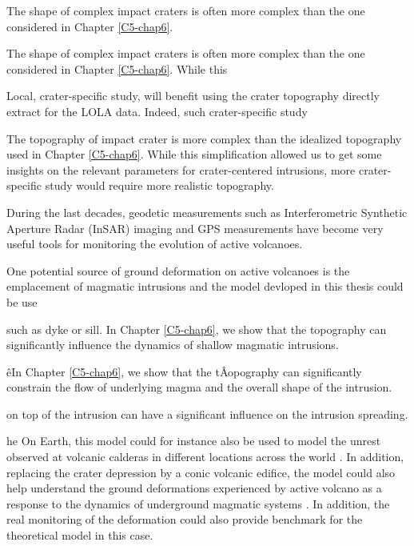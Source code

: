 The shape of complex impact craters is often more complex than the one
considered in Chapter \ref{C5-chap6}. 

The shape of complex impact craters is often more complex than the one
considered in Chapter \ref{C5-chap6}. While this 


Local,  crater-specific study,
will benefit using the crater topography directly extract for the LOLA
data.  Indeed,   such  crater-specific  study  


The topography  of impact  crater is more  complex than  the idealized
topography used  in Chapter \ref{C5-chap6}. While  this simplification
allowed  us  to get  some  insights  on  the relevant  parameters  for
crater-centered intrusions,  more crater-specific study  would require
more realistic topography. 





During the last decades, geodetic measurements such as Interferometric
Synthetic  Aperture Radar  (InSAR) imaging  and GPS  measurements have
become  very  useful tools  for  monitoring  the evolution  of  active
volcanoes.  



One  potential source  of  ground  deformation on  active
volcanoes  is the  emplacement of  magmatic intrusions  and the  model
devloped in this thesis could be use 

 such as  dyke or
sill\citep{Galland:2013dp,Galland:2012hi,Cayol:2014vo}.   In   Chapter
\ref{C5-chap6},  we   show  that  the  topography   can  significantly
influence the dynamics of shallow magmatic intrusions.


êIn   Chapter  \ref{C5-chap6},   we  show   that  the   tÂopography  can
significantly constrain the  flow of underlying magma  and the overall
shape of the intrusion. 

on  top of the
intrusion  can   have  a   significant  influence  on   the  intrusion
spreading. 


he On Earth, this model
could  for instance  also  be used  to model  the  unrest observed  at
volcanic   calderas   in   different  locations   across   the   world
\citep{Macedonio:2014et}. In addition, replacing the crater depression
by a conic volcanic edifice, the  model could also help understand the
ground deformations experienced by active volcano as a response to the
dynamics         of        underground         magmatic        systems
\citep{Cayol:2014vo,Pedersen:2004kp,Patane:2006hn,Bonaccorso:2001iw,ChadwickJr:1995cz,Cannavo:2015fk}.
In addition, the real monitoring of the deformation could also provide
benchmark for the theoretical model in this case.

